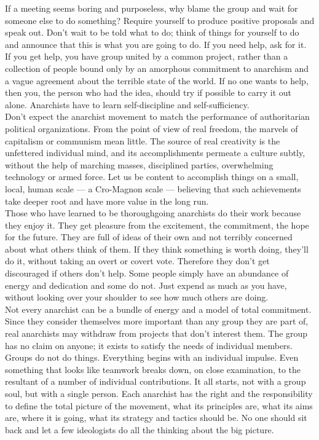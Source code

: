 If a meeting seems boring and purposeless, why blame the group and wait for someone else to do something? Require yourself to produce positive proposals and speak out. Don't wait to be told what to do; think of things for yourself to do and announce that this is what you are going to do. If you need help, ask for it. If you get help, you have group united by a common project, rather than a collection of people bound only by an amorphous commitment to anarchism and a vague agreement about the terrible state of the world. If no one wants to help, then you, the person who had the idea, should try if possible to carry it out alone. Anarchists have to learn self-discipline and self-sufficiency.\\
Don't expect the anarchist movement to match the performance of authoritarian political organizations. From the point of view of real freedom, the marvels of capitalism or communism mean little. The source of real creativity is the unfettered individual mind, and its accomplishments permeate a culture subtly, without the help of marching masses, disciplined parties, overwhelming technology or armed force. Let us be content to accomplish things on a small, local, human scale --- a Cro-Magnon scale --- believing that such achievements take deeper root and have more value in the long run.\\
Those who have learned to be thoroughgoing anarchists do their work because they enjoy it. They get pleasure from the excitement, the commitment, the hope for the future. They are full of ideas of their own and not terribly concerned about what others think of them. If they think something is worth doing, they'll do it, without taking an overt or covert vote. Therefore they don't get discouraged if others don't help. Some people simply have an abundance of energy and dedication and some do not. Just expend as much as you have, without looking over your shoulder to see how much others are doing.\\
Not every anarchist can be a bundle of energy and a model of total commitment. Since they consider themselves more important than any group they are part of, real anarchists may withdraw from projects that don't interest them. The group has no claim on anyone; it exists to satisfy the needs of individual members.\\
Groups do not do things. Everything begins with an individual impulse. Even something that looks like teamwork breaks down, on close examination, to the resultant of a number of individual contributions. It all starts, not with a group soul, but with a single person. Each anarchist has the right and the responsibility to define the total picture of the movement, what its principles are, what its aims are, where it is going, what its strategy and tactics should be. No one should sit back and let a few ideologists do all the thinking about the big picture.\\

